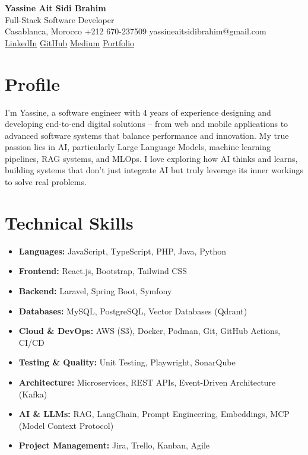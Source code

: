\documentclass[10pt,a4paper]{article}
\begin{document}
\begin{center}
    {\huge\color{headercolor}\textbf{Yassine Ait Sidi Brahim}}\\[2pt]
    {\large\color{sectioncolor}Full-Stack Software Developer}\\[4pt]
    {\small
      Casablanca, Morocco \quad\textbar\quad
      +212 670-237509 \quad\textbar\quad
      yassineaitsidibrahim@gmail.com
    }\\[2pt]
    {\small
      \href{https://www.linkedin.com/in/yassine-aitsidi-brahim/}{LinkedIn} \quad\textbar\quad
      \href{https://github.com/Asyassin10}{GitHub} \quad\textbar\quad
      \href{https://yassineaitsidibrahim.medium.com/}{Medium} \quad\textbar\quad
      \href{https://www.yassine-aitsidibrahim.space/}{Portfolio}
    }
\end{center}

\vspace{2pt}

\section*{Profile}
{\small
I'm Yassine, a software engineer with 4 years of experience designing and developing end-to-end digital solutions -- from web and mobile applications to advanced software systems that balance performance and innovation. My true passion lies in AI, particularly Large Language Models, machine learning pipelines, RAG systems, and MLOps. I love exploring how AI thinks and learns, building systems that don't just integrate AI but truly leverage its inner workings to solve real problems.
}

\section*{Technical Skills}
{\small
\begin{itemize}[itemsep=2pt]
  \item \textbf{Languages:} JavaScript, TypeScript, PHP, Java, Python
  \item \textbf{Frontend:} React.js, Bootstrap, Tailwind CSS
  \item \textbf{Backend:} Laravel, Spring Boot, Symfony
  \item \textbf{Databases:} MySQL, PostgreSQL, Vector Databases (Qdrant)
  \item \textbf{Cloud \& DevOps:} AWS (S3), Docker, Podman, Git, GitHub Actions, CI/CD
  \item \textbf{Testing \& Quality:} Unit Testing, Playwright, SonarQube
  \item \textbf{Architecture:} Microservices, REST APIs, Event-Driven Architecture (Kafka)
  \item \textbf{AI \& LLMs:} RAG, LangChain, Prompt Engineering, Embeddings, MCP (Model Context Protocol)
  \item \textbf{Project Management:} Jira, Trello, Kanban, Agile
\end{itemize}
}
\end{document}
